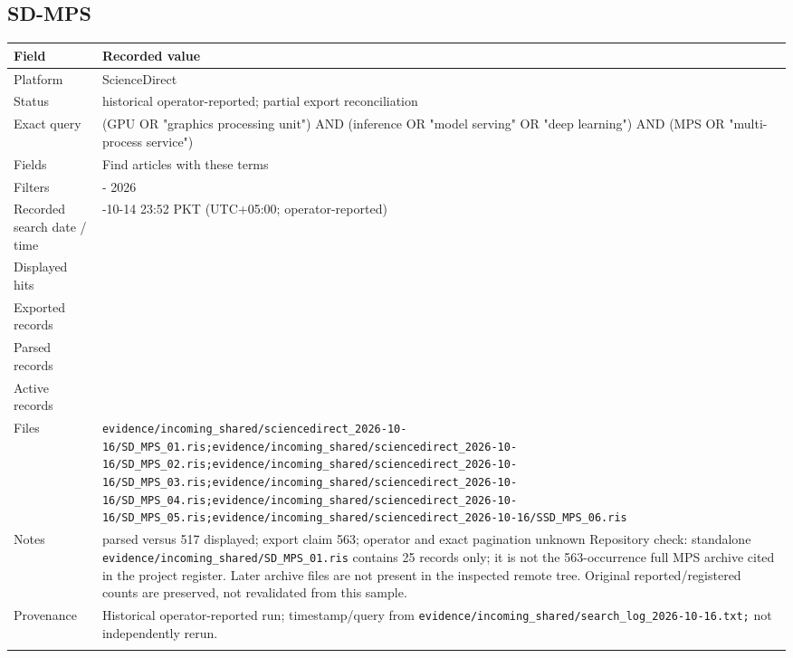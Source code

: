 \subsection{SD-MPS}

\begin{longtable}{>{\raggedright\arraybackslash}p{}>{\raggedright\arraybackslash}p{}}
\toprule
\textbf{Field} & \textbf{Recorded value}\\\midrule\endhead
Platform & ScienceDirect\\\addlinespace
Status & historical operator-reported; partial export reconciliation\\\addlinespace
Exact query & (GPU OR "graphics processing unit") AND (inference OR "model serving" OR "deep learning") AND (MPS OR "multi-process service")\\\addlinespace
Fields & Find articles with these terms\\\addlinespace
Filters & 2020 - 2026\\\addlinespace
Recorded search date / time & 2026-10-14 23:52 PKT (UTC+05:00; operator-reported)\\\addlinespace
Displayed hits & 517\\\addlinespace
Exported records & 563\\\addlinespace
Parsed records & 563\\\addlinespace
Active records & 563\\\addlinespace
Files & \nolinkurl{evidence/incoming_shared/sciencedirect_2026-10-16/SD_MPS_01.ris;evidence/incoming_shared/sciencedirect_2026-10-16/SD_MPS_02.ris;evidence/incoming_shared/sciencedirect_2026-10-16/SD_MPS_03.ris;evidence/incoming_shared/sciencedirect_2026-10-16/SD_MPS_04.ris;evidence/incoming_shared/sciencedirect_2026-10-16/SD_MPS_05.ris;evidence/incoming_shared/sciencedirect_2026-10-16/SSD_MPS_06.ris}\\\addlinespace
Notes & 563 parsed versus 517 displayed; export claim 563; operator and exact pagination unknown Repository check: standalone \nolinkurl{evidence/incoming_shared/SD_MPS_01.ris} contains 25 records only; it is not the 563-occurrence full MPS archive cited in the project register. Later archive files are not present in the inspected remote tree. Original reported/registered counts are preserved, not revalidated from this sample.\\\addlinespace
Provenance & Historical operator-reported run; timestamp/query from \nolinkurl{evidence/incoming_shared/search_log_2026-10-16.txt;} not independently rerun.\\\addlinespace
\bottomrule\end{longtable}

